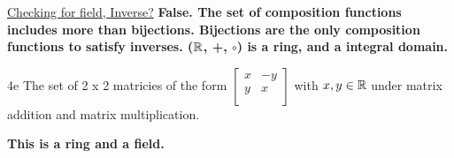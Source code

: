 \underline{Checking for field, Inverse?} \textbf{False. The set of composition functions includes more than bijections. Bijections are the only composition functions to satisfy inverses. ($\mathbb{R}$, +, $\circ$) is a ring, and a integral domain.}


\begin{question}{4e}
The set of 2 x 2 matricies of the form $\begin{bmatrix}
  x & -y \\
  y & x  \\
 \end{bmatrix}$ with $x,y \in \mathbb{R}$ under matrix addition and matrix multiplication. 
\end{question}

\textbf{This is a ring and a field.}

